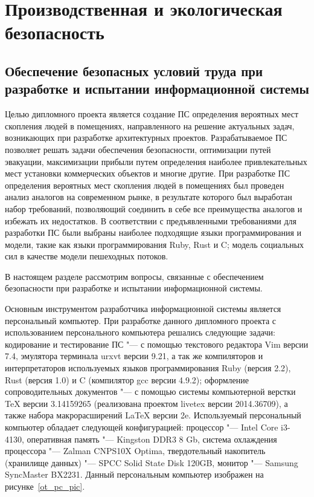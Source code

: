 \section{Производственная и экологическая безопасность}
\subsection{Обеспечение безопасных условий труда при разработке и испытании информационной системы}

Целью дипломного проекта является создание ПС определения вероятных мест скопления людей в помещениях,
направленного на решение актуальных задач, возникающих при разработке архитектурных проектов.
Разрабатываемое ПС позволяет решать задачи обеспечения безопасности, оптимизации путей эвакуации,
максимизации прибыли путем определения наиболее привлекательных мест установки коммерческих объектов и многие другие.
При разработке ПС определения вероятных мест скопления людей в помещениях был проведен анализ аналогов на современном рынке,
в результате которого был выработан набор требований, позволяющий соединить в себе все преимущества аналогов и избежать их недостатков.
В соответствии с предъявленными требованиями для разработки ПС были выбраны наиболее подходящие языки программирования и модели, такие как
языки программирования Ruby, Rust и C; модель социальных сил в качестве модели пешеходных потоков.

В настоящем разделе рассмотрим вопросы, связанные с обеспечением безопасности при разработке и испытании информационной системы.

Основным инструментом разработчика информационной системы является персональный компьютер.
При разработке данного дипломного проекта с использованием персонального компьютера решались следующие задачи:
  кодирование и тестирование ПС "--- с помощью текстового редактора Vim версии 7.4, эмулятора терминала urxvt версии 9.21, а так же компиляторов и интерпретаторов используемых языков программирования Ruby (версия 2.2), Rust (версия 1.0) и C (компилятор gcc версии 4.9.2);
  оформление сопроводительных документов "--- с помощью системы компьютерной верстки TeX версии 3.14159265 (реализована проектом livetex версии 2014.36709), а также набора макрорасширений LaTeX версии 2e.
Используемый персональный компьютер обладает следующей конфигурацией: процессор "--- Intel Core i3-4130, оперативная память "--- Kingston DDR3 8 Gb,
  система охлаждения процессора "--- Zalman CNPS10X Optima, твердотельный накопитель (хранилище данных) "--- SPCC Solid State Disk 120GB,
  монитор "--- Samsung SyncMaster BX2231.
Данный персональным компьютер изображен на рисунке~\ref{ot_pc_pic}.

